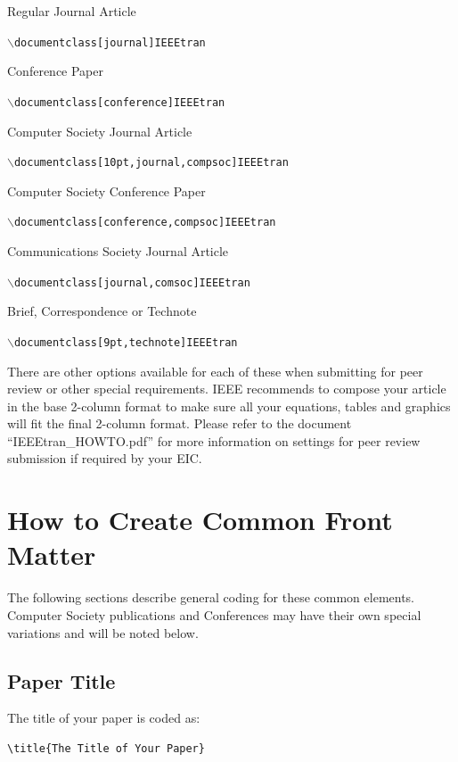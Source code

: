 \documentclass[lettersize,journal]{IEEEtran} %
\begin{document}
\begin{list}{}{}
\item{Regular Journal Article}
\item{{\tt{$\backslash$documentclass[journal]{IEEEtran}}}}\\
\item{{Conference Paper}}
\item{{\tt{$\backslash$documentclass[conference]{IEEEtran}}}}\\
\item{Computer Society Journal Article}
\item{{\tt{$\backslash$documentclass[10pt,journal,compsoc]{IEEEtran}}}}\\
\item{Computer Society Conference Paper}
\item{{\tt{$\backslash$documentclass[conference,compsoc]{IEEEtran}}}}\\
\item{{Communications Society Journal Article}}
\item{{\tt{$\backslash$documentclass[journal,comsoc]{IEEEtran}}}}\\
\item{{Brief, Correspondence or Technote}}
\item{{\tt{$\backslash$documentclass[9pt,technote]{IEEEtran}}}}
\end{list}

There are other options available for each of these when submitting for peer review or other special requirements. IEEE recommends to compose your article in the base 2-column format to make sure all your equations, tables and graphics will fit the final 2-column format. Please refer to the document ``IEEEtran\_HOWTO.pdf'' for more information on settings for peer review submission if required by your EIC.

\section{How to Create Common Front Matter}
\noindent The following sections describe general coding for these common elements. Computer Society publications and Conferences may have their own special variations and will be noted below.
\subsection{Paper Title}
\noindent The title of your paper is coded as:

\begin{verbatim}
\title{The Title of Your Paper}
\end{verbatim}
\end{document}
